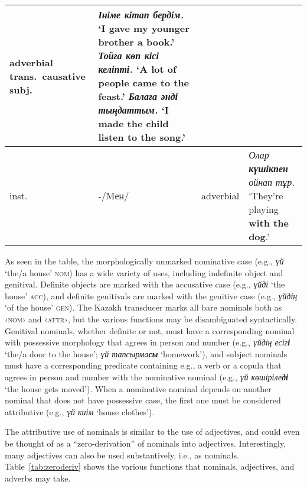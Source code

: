 \documentclass[a4paper,11pt, onecolumn,twoside]{article}
\newcommand{\gmk}[1]{{\rm {\ll \textsc{#1}}}}
\newcommand{\kazakh}[1]{{\em #1}}
\newcommand{\gloss}[1]{`#1'}
\newcommand{\sgloss}[1]{\hspace{0.5em}`#1'}
\newcommand{\tag}[1]{{\ll \textsc{‹#1›}}}
\begin{document}
\begin{table}[htbp]
\begin{small}
\begin{tabular}{l l p{9em} p{28em}}
										adverbial\newline
										trans.\ causative subj.%
									& \kazakh{\textbf{Ініме} кітап бердім.} \sgloss{I gave \textbf{my younger brother} a book.} \newline
										\kazakh{\textbf{Тойға} көп кісі келіпті.} \sgloss{A lot of people came \textbf{to the feast.}}\newline
										\kazakh{\textbf{Балаға} әнді тыңдаттым.} \sgloss{I made \textbf{the child} listen to the song.}
										\\\midrule
				inst. & -/Mен/ &  adverbial & \kazakh{Олар \textbf{күшікпен} ойнап тұр.} \sgloss{They're playing \textbf{with the dog}.} \\
			\bottomrule
		\end{tabular}
	\end{small}
\end{table}

As seen in the table, the morphologically unmarked nominative case (e.g., \kazakh{үй} \gloss{the/a house} \gmk{nom}) has a wide variety of uses, including indefinite object and genitival.  Definite objects are marked with the accusative case (e.g., \kazakh{үйді} \gloss{the house} \gmk{acc}), and definite genitivals are marked with the genitive case (e.g., \kazakh{үйдің} \gloss{of the house} \gmk{gen}).  The Kazakh transducer marks all bare nominals both as \tag{nom} and \tag{attr}, but the various functions may be disambiguated syntactically.  Genitival nominals, whether definite or not, must have a corresponding nominal with possessive morphology that agrees in person and number (e.g., \kazakh{үйдің есіг\textbf{і}} \gloss{the/a door to the house}; \kazakh{үй тапсырма\textbf{сы}} \gloss{homework}), and subject nominals must have a corresponding predicate containing e.g., a verb or a copula that agrees in person and number with the nominative nominal (e.g., \kazakh{үй көшіріле\textbf{ді}} \gloss{the house gets moved}).  When a nominative nominal depends on another nominal that does not have possessive case, the first one must be considered attributive (e.g., \kazakh{үй киім} \gloss{house clothes}).

The attributive use of nominals is similar to the use of adjectives, and could even be thought of as a ``zero-derivation'' of nominals into adjectives.  Interestingly, many adjectives can also be used substantively, i.e., as nominals.  Table~\ref{tab:zeroderiv} shows the various functions that nominals, adjectives, and adverbs may take.
\end{document}
